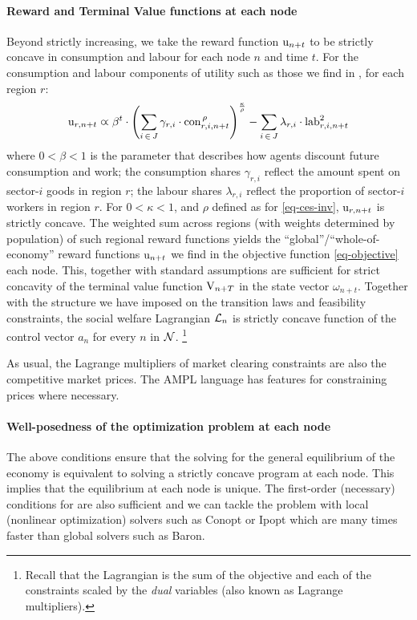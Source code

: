 \documentclass[12pt,a4paper,twoside, draft]{article}
\newcommand{\mrpropto}{\mathrel{\varpropto}}
\begin{document}
\paragraph{Reward and Terminal Value functions at each node}
Beyond strictly increasing, we take the reward function $\textup{u}_{n + t}$
to be strictly concave in consumption and labour for each node $n$ and time
$t$.
For the consumption and labour components of utility such as those we find in
\citet{Atalay-Sectoral_shocks}, for each region $r$:
\begin{equation}
   \textup{u}_{r, n + t} \mrpropto \beta^{t} \cdot \left(
   \sum_{i \,\in\, J} \gamma_{r, i} \cdot \textup{con}_{r, i, n + t} ^ {\,\rho}
   \right) ^ {\frac{\kappa}{\rho}}
   - \sum_{i \,\in\, J} \lambda_{r, i} \cdot \textup{lab}_{r, i, n + t}^{2}
\end{equation}
where $0 < \beta < 1$ is the parameter that describes how agents discount
future consumption and work; the consumption shares $\gamma_{r, i}$ reflect
the amount spent on sector-$i$ goods in region $r$; the labour shares
$\lambda_{r, i}$ reflect the proportion of sector-$i$ workers in region $r$.
For $0 < \kappa < 1$, and $\rho$ defined as for \cref{eq-ces-inv},
$\textup{u}_{r, n + t}$ is strictly concave.
The weighted sum across regions (with weights determined by population) of such
regional reward functions yields the ``global''/``whole-of-economy'' reward
functions $\textup{u}_{n + t}$ we find in the objective function
\eqref{eq-objective} each node.
This, together with standard assumptions \citep[Theorem
12.2.12]{Stachurski-Economic_dynamics} are sufficient for strict concavity of the
terminal value function $\textup{V}_{n + T}$ in the state vector
$\omega_{n + t}$.
Together with the structure we have imposed on the transition laws and
feasibility constraints, the social welfare Lagrangian $\mathcal L_{n}$ is
strictly concave function of the control vector $a_{n}$ for every $n$ in
$\mathcal N$.
\footnote{
Recall that the Lagrangian is the sum of the objective and each of the
constraints scaled by the \emph{dual} variables (also known as Lagrange
multipliers).
}
\begin{remark*}
As usual, the Lagrange multipliers of market clearing constraints are also the
competitive market prices.
The AMPL language has features for constraining prices where necessary.
\end{remark*}
\paragraph{Well-posedness of the optimization problem at each node}
The above conditions ensure that the solving for the general equilibrium of the
economy is equivalent to solving a strictly concave program at each node.
This implies that the equilibrium at each node is unique.
The first-order (necessary) conditions for are also sufficient and we can
tackle the problem with local (nonlinear optimization) solvers such as Conopt
or Ipopt which are many times faster than global solvers such as Baron.
\end{document}
